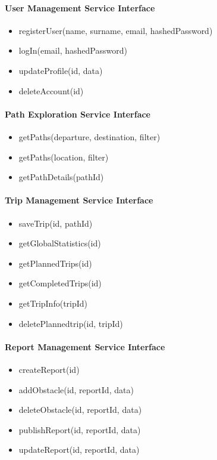\paragraph{User Management Service Interface}
\begin{itemize}
    \item registerUser(name, surname, email, hashedPassword)
    \item logIn(email, hashedPassword)
    \item updateProfile(id, data)
    \item deleteAccount(id)
\end{itemize}

\paragraph{Path Exploration Service Interface}
\begin{itemize}
    \item getPaths(departure, destination, filter)
    \item getPaths(location, filter)
    \item getPathDetails(pathId)
\end{itemize}

\paragraph{Trip Management Service Interface}
\begin{itemize}
    \item saveTrip(id, pathId)
    \item getGlobalStatistics(id)
    \item getPlannedTrips(id)
    \item getCompletedTrips(id)
    \item getTripInfo(tripId)
    \item deletePlannedtrip(id, tripId)
\end{itemize}

\paragraph{Report Management Service Interface}
\begin{itemize}
    \item createReport(id)
    \item addObstacle(id, reportId, data)
    \item deleteObstacle(id, reportId, data)
    \item publishReport(id, reportId, data)
    \item updateReport(id, reportId, data)
\end{itemize}

